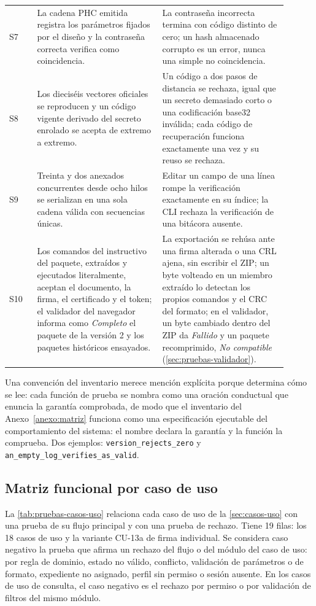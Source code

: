 \begin{longtable}{@{}l L{0.45\linewidth} L{0.45\linewidth}@{}}
  \addlinespace
  S7 & La cadena PHC emitida registra los parámetros fijados por el diseño y la contraseña correcta verifica como coincidencia. & La contraseña incorrecta termina con código distinto de cero; un hash almacenado corrupto es un error, nunca una simple no coincidencia. \\
  \addlinespace
  S8 & Los dieciséis vectores oficiales se reproducen y un código vigente derivado del secreto enrolado se acepta de extremo a extremo. & Un código a dos pasos de distancia se rechaza, igual que un secreto demasiado corto o una codificación base32 inválida; cada código de recuperación funciona exactamente una vez y su reuso se rechaza. \\
  \addlinespace
  S9 & Treinta y dos anexados concurrentes desde ocho hilos se serializan en una sola cadena válida con secuencias únicas. & Editar un campo de una línea rompe la verificación exactamente en su índice; la CLI rechaza la verificación de una bitácora ausente. \\
  \addlinespace
  S10 & Los comandos del instructivo del paquete, extraídos y ejecutados literalmente, aceptan el documento, la firma, el certificado y el token; el validador del navegador informa como \emph{Completo} el paquete de la versión 2 y los paquetes históricos ensayados. & La exportación se rehúsa ante una firma alterada o una CRL ajena, sin escribir el ZIP; un byte volteado en un miembro extraído lo detectan los propios comandos y el CRC del formato; en el validador, un byte cambiado dentro del ZIP da \emph{Fallido} y un paquete recomprimido, \emph{No compatible} (\cref{sec:pruebas-validador}). \\
\end{longtable}

Una convención del inventario merece mención explícita porque determina cómo se lee: cada función de prueba se nombra como una oración conductual que enuncia la garantía comprobada, de modo que el inventario del Anexo~\ref{anexo:matriz} funciona como una especificación ejecutable del comportamiento del sistema: el nombre declara la garantía y la función la comprueba. Dos ejemplos: \texttt{version\_rejects\_zero} y \texttt{an\_empty\_log\_verifies\_as\_valid}.

\subsection{Matriz funcional por caso de uso}\label{sec:pruebas-matriz-casos-uso}

La \cref{tab:pruebas-casos-uso} relaciona cada caso de uso de la \cref{sec:casos-uso} con una prueba de su flujo principal y con una prueba de rechazo. Tiene 19 filas: los 18 casos de uso y la variante CU-13a de firma individual. Se considera caso negativo la prueba que afirma un rechazo del flujo o del módulo del caso de uso: por regla de dominio, estado no válido, conflicto, validación de parámetros o de formato, expediente no asignado, perfil sin permiso o sesión ausente. En los casos de uso de consulta, el caso negativo es el rechazo por permiso o por validación de filtros del mismo módulo.

